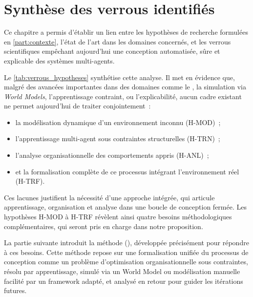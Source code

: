 \section*{Synthèse des verrous identifiés}

\noindent
Ce chapitre a permis d'établir un lien entre les hypothèses de recherche formulées en \autoref{part:contexte}, l'état de l'art dans les domaines concernés, et les verrous scientifiques empêchant aujourd'hui une conception automatisée, sûre et explicable des systèmes multi-agents.

\medskip

\noindent
Le \autoref{tab:verrous_hypotheses} synthétise cette analyse. Il met en évidence que, malgré des avancées importantes dans des domaines comme le , la simulation via \textit{World Models}, l'apprentissage contraint, ou l'explicabilité, aucun cadre existant ne permet aujourd'hui de traiter conjointement~:
\begin{itemize}
  \item la modélisation dynamique d'un environnement inconnu (H-MOD)~;
  \item l'apprentissage multi-agent sous contraintes structurelles (H-TRN)~;
  \item l'analyse organisationnelle des comportements appris (H-ANL)~;
  \item et la formalisation complète de ce processus intégrant l'environnement réel (H-TRF).
\end{itemize}

\noindent
Ces lacunes justifient la nécessité d'une approche intégrée, qui articule apprentissage, organisation et analyse dans une boucle de conception fermée. Les hypothèses H-MOD à H-TRF révèlent ainsi quatre besoins méthodologiques complémentaires, qui seront pris en charge dans notre proposition.

\medskip

\noindent
La partie suivante introduit la méthode \textbf{} (), développée précisément pour répondre à ces besoins. Cette méthode repose sur une formalisation unifiée du processus de conception comme un problème d'optimisation organisationnelle sous contraintes, résolu par apprentissage, simulé via un World Model ou modélisation manuelle facilité par un framework adapté, et analysé en retour pour guider les itérations futures.



\clearpage
\thispagestyle{empty}
\null
\newpage

